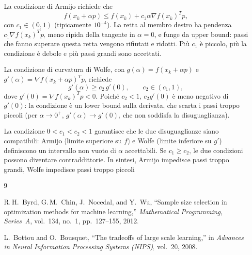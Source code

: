 \documentclass[a4paper,12pt]{article}
\begin{document}
La condizione di Armijo richiede che
\[
f(x_k+\alpha p) \le f(x_k) + c_1 \alpha \nabla f(x_k)^T p,
\]
con $c_1 \in (0,1)$ (tipicamente $10^{-4}$). La retta al membro destro ha pendenza $c_1\nabla f(x_k)^Tp$, meno ripida della tangente in $\alpha=0$, e funge da upper bound: passi che fanno superare questa retta vengono rifiutati e ridotti. Più $c_1$ è piccolo, più la condizione è debole e più passi grandi sono accettati.

La condizione di curvatura di Wolfe, con $g(\alpha)=f(x_k+\alpha p)$ e $g'(\alpha)=\nabla f(x_k+\alpha p)^Tp$, richiede
\[
g'(\alpha) \ge c_2 \, g'(0), \qquad c_2 \in (c_1,1),
\]
dove $g'(0)=\nabla f(x_k)^Tp<0$. Poiché $c_2<1$, $c_2g'(0)$ è meno negativo di $g'(0)$: la condizione è un lower bound sulla derivata, che scarta i passi troppo piccoli (per $\alpha\to0^+$, $g'(\alpha)\to g'(0)$, che non soddisfa la disuguaglianza).

La condizione $0<c_1<c_2<1$ garantisce che le due disuguaglianze siano compatibili: Armijo (limite superiore su $f$) e Wolfe (limite inferiore su $g'$) definiscono un intervallo non vuoto di $\alpha$ accettabili. Se $c_1\ge c_2$, le due condizioni possono diventare contraddittorie. In sintesi, Armijo impedisce passi troppo grandi, Wolfe impedisce passi troppo piccoli
\begin{thebibliography}{9}

R.\,H.~Byrd, G.\,M.~Chin, J.~Nocedal, and Y.~Wu,
``Sample size selection in optimization methods for machine learning,''
\textit{Mathematical Programming, Series~A}, vol.~134, no.~1, pp.~127--155, 2012.

L.~Bottou and O.~Bousquet,
``The tradeoffs of large scale learning,''
in \textit{Advances in Neural Information Processing Systems (NIPS)}, vol.~20, 2008.


\end{thebibliography}
\end{document}
